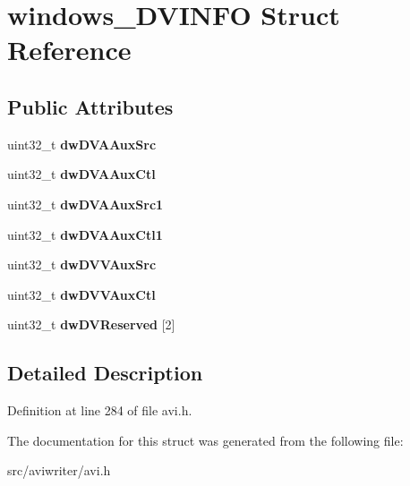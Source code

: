 \hypertarget{structwindows__DVINFO}{\section{windows\-\_\-\-D\-V\-I\-N\-F\-O Struct Reference}
\label{structwindows__DVINFO}
}
\subsection*{Public Attributes}
\begin{DoxyCompactItemize}
\item 
\hypertarget{structwindows__DVINFO_af9c99d343d9d098d07879ca20ac9487f}{uint32\-\_\-t {\bfseries dw\-D\-V\-A\-Aux\-Src}}\label{structwindows__DVINFO_af9c99d343d9d098d07879ca20ac9487f}

\item 
\hypertarget{structwindows__DVINFO_a0d099a096f4f1d1b686d22f54068febf}{uint32\-\_\-t {\bfseries dw\-D\-V\-A\-Aux\-Ctl}}\label{structwindows__DVINFO_a0d099a096f4f1d1b686d22f54068febf}

\item 
\hypertarget{structwindows__DVINFO_aeb2553b1821fb6070f457affbd30193b}{uint32\-\_\-t {\bfseries dw\-D\-V\-A\-Aux\-Src1}}\label{structwindows__DVINFO_aeb2553b1821fb6070f457affbd30193b}

\item 
\hypertarget{structwindows__DVINFO_ac1655c3c121d1dfdcf36cd156ee66f7b}{uint32\-\_\-t {\bfseries dw\-D\-V\-A\-Aux\-Ctl1}}\label{structwindows__DVINFO_ac1655c3c121d1dfdcf36cd156ee66f7b}

\item 
\hypertarget{structwindows__DVINFO_ad544d9e61f992f7c3ca1f0578ba07545}{uint32\-\_\-t {\bfseries dw\-D\-V\-V\-Aux\-Src}}\label{structwindows__DVINFO_ad544d9e61f992f7c3ca1f0578ba07545}

\item 
\hypertarget{structwindows__DVINFO_a275cd557f972b4b74f9637cd68d18092}{uint32\-\_\-t {\bfseries dw\-D\-V\-V\-Aux\-Ctl}}\label{structwindows__DVINFO_a275cd557f972b4b74f9637cd68d18092}

\item 
\hypertarget{structwindows__DVINFO_aab36802ccf4764ffe33d818a3fafce10}{uint32\-\_\-t {\bfseries dw\-D\-V\-Reserved} \mbox{[}2\mbox{]}}\label{structwindows__DVINFO_aab36802ccf4764ffe33d818a3fafce10}

\end{DoxyCompactItemize}


\subsection{Detailed Description}


Definition at line 284 of file avi.\-h.



The documentation for this struct was generated from the following file\-:\begin{DoxyCompactItemize}
\item 
src/aviwriter/avi.\-h\end{DoxyCompactItemize}

